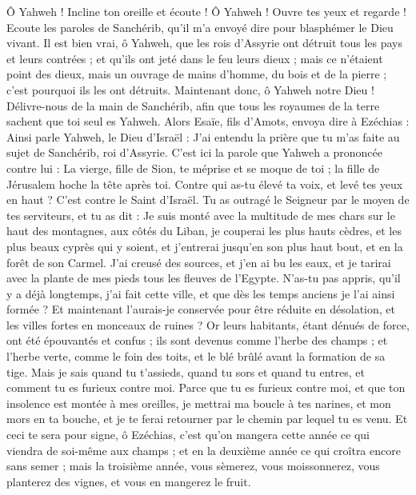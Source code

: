 \begin{multicols}{2}
Ô Yahweh ! Incline ton oreille et écoute ! Ô Yahweh ! Ouvre tes yeux et regarde ! Ecoute les paroles de Sanchérib, qu'il m'a envoyé dire pour blasphémer le Dieu vivant.
Il est bien vrai, ô Yahweh, que les rois d'Assyrie ont détruit tous les pays et leurs contrées ;
et qu'ils ont jeté dans le feu leurs dieux ; mais ce n'étaient point des dieux, mais un ouvrage de mains d'homme, du bois et de la pierre ; c'est pourquoi ils les ont détruits.
Maintenant donc, ô Yahweh notre Dieu ! Délivre-nous de la main de Sanchérib, afin que tous les royaumes de la terre sachent que toi seul es Yahweh.
Alors Esaïe, fils d'Amots, envoya dire à Ezéchias : Ainsi parle Yahweh, le Dieu d'Israël : J'ai entendu la prière que tu m'as faite au sujet de Sanchérib, roi d'Assyrie.
C'est ici la parole que Yahweh a prononcée contre lui : La vierge, fille de Sion, te méprise et se moque de toi ; la fille de Jérusalem hoche la tête après toi.
Contre qui as-tu élevé ta voix, et levé tes yeux en haut ? C'est contre le Saint d'Israël.
Tu as outragé le Seigneur par le moyen de tes serviteurs, et tu as dit : Je suis monté avec la multitude de mes chars sur le haut des montagnes, aux côtés du Liban, je couperai les plus hauts cèdres, et les plus beaux cyprès qui y soient, et j'entrerai jusqu'en son plus haut bout, et en la forêt de son Carmel.
J'ai creusé des sources, et j'en ai bu les eaux, et je tarirai avec la plante de mes pieds tous les fleuves de l'Egypte.
N'as-tu pas appris, qu'il y a déjà longtemps, j'ai fait cette ville, et que dès les temps anciens je l'ai ainsi formée ? Et maintenant l'aurais-je conservée pour être réduite en désolation, et les villes fortes en monceaux de ruines ?
Or leurs habitants, étant dénués de force, ont été épouvantés et confus ; ils sont devenus comme l'herbe des champs ; et l'herbe verte, comme le foin des toits, et le blé brûlé avant la formation de sa tige.
Mais je sais quand tu t'assieds, quand tu sors et quand tu entres, et comment tu es furieux contre moi.
Parce que tu es furieux contre moi, et que ton insolence est montée à mes oreilles, je mettrai ma boucle à tes narines, et mon mors en ta bouche, et je te ferai retourner par le chemin par lequel tu es venu.
Et ceci te sera pour signe, ô Ezéchias, c'est qu'on mangera cette année ce qui viendra de soi-même aux champs ; et en la deuxième année ce qui croîtra encore sans semer ; mais la troisième année, vous sèmerez, vous moissonnerez, vous planterez des vignes, et vous en mangerez le fruit.

\end{multicols}
